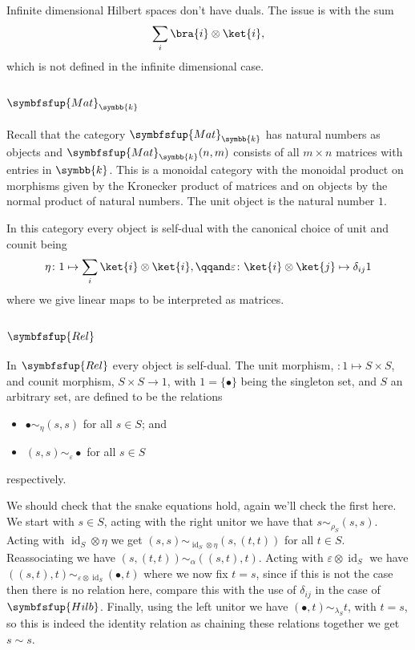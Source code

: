 \documentclass[fleqn]{NotesClass}
\makeatletter
\newcommand{\c@egory}[1]{\symbfsfup{#1}}
\newcommand{\Rel}{\c@egory{Rel}}
\renewcommand{\field}{\symbb{k}}
\newcommand{\Mat}[1][\field]{{\c@egory{Mat}_{#1}}}
\newcommand{\Hilb}{\c@egory{Hilb}}
\DeclareMathOperator{\id}{id}
\makeatother
\begin{document}
    Infinite dimensional Hilbert spaces don't have duals.
    The issue is with the sum
    \begin{equation}
        \sum_i \bra{i} \otimes \ket{i},
    \end{equation}
    which is not defined in the infinite dimensional case.
    
    \subsection{\texorpdfstring{\(\Mat\)}{Mat}}
    Recall that the category \(\Mat\) has natural numbers as objects and \(\Mat(n, m)\) consists of all \(m \times n\) matrices with entries in \(\field\).
    This is a monoidal category with the monoidal product on morphisms given by the Kronecker product of matrices and on objects by the normal product of natural numbers.
    The unit object is the natural number \(1\).
    
    In this category every object is self-dual with the canonical choice of unit and counit being
    \begin{equation}
        \eta \colon 1 \mapsto \sum_i \ket{i} \otimes \ket{i}, \qqand \varepsilon \colon \ket{i} \otimes \ket{j} \mapsto \delta_{ij}1
    \end{equation}
    where we give linear maps to be interpreted as matrices.
    
    \subsection{\texorpdfstring{\(\Rel\)}{Rel}}
    In \(\Rel\) every object is self-dual.
    The unit morphism, \(\colon 1 \mapsto S \times S\), and counit morphism, \(S \times S \to 1\), with \(1 = \{\bullet\}\) being the singleton set, and \(S\) an arbitrary set, are defined to be the relations
    \begin{itemize}
        \item \(\bullet \sim_\eta (s, s)\) for all \(s \in S\); and
        \item \((s, s) \sim_\varepsilon \bullet\) for all \(s \in S\)
    \end{itemize}
    respectively.
    
    We should check that the snake equations hold, again we'll check the first here.
    We start with \(s \in S\), acting with the right unitor we have that \(s \sim_{\rho_S} (s, s)\).
    Acting with \({\id_S} \otimes \eta\) we get \((s, s) \sim_{{\id_S} \otimes \eta} (s, (t, t))\) for all \(t \in S\).
    Reassociating we have \((s, (t, t)) \sim_\alpha ((s, t), t)\).
    Acting with \(\varepsilon \otimes \id_S\) we have \(((s, t), t) \sim_{\varepsilon \otimes \id_S} (\bullet, t)\) where we now fix \(t = s\), since if this is not the case then there is no relation here, compare this with the use of \(\delta_{ij}\) in the case of \(\Hilb\).
    Finally, using the left unitor we have \((\bullet, t) \sim_{\lambda_S} t\), with \(t = s\), so this is indeed the identity relation as chaining these relations together we get \(s \sim s\).
    
\end{document}
